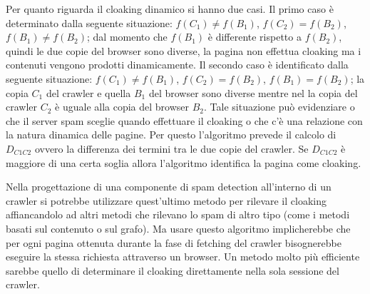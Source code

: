 Per quanto riguarda il cloaking dinamico si hanno due casi. Il primo caso è determinato dalla seguente situazione: \(f(C_1)\not=f(B_1)\), \(f(C_2)=f(B_2)\), \(f(B_1)\not=f(B_2)\); dal momento che \(f(B_1)\) è differente rispetto a \(f(B_2)\), quindi le due copie del browser sono diverse,  la pagina non effettua cloaking ma i contenuti vengono prodotti dinamicamente. Il secondo caso è identificato dalla seguente situazione: \(f(C_1)\not=f(B_1)\), \(f(C_2)=f(B_2)\), \(f(B_1)=f(B_2)\); la copia \(C_1\) del crawler e quella \(B_1\) del browser sono diverse mentre nel  la copia del crawler \(C_2\) è uguale alla copia del browser \(B_2\). Tale situazione può evidenziare o che il server spam sceglie quando effettuare il cloaking o che c'è una relazione con la natura dinamica delle pagine. Per questo l'algoritmo prevede il calcolo di \(D_{C1C2}\) ovvero la differenza dei termini tra le due copie del crawler. Se \(D_{C1C2}\) è maggiore di una certa soglia allora l'algoritmo identifica la pagina come cloaking.

Nella progettazione di una componente di spam detection all'interno di un crawler si potrebbe utilizzare quest'ultimo metodo per rilevare il cloaking affiancandolo ad altri metodi che rilevano lo spam di altro tipo (come i metodi basati sul contenuto o sul grafo). Ma usare questo algoritmo  implicherebbe che per ogni pagina ottenuta durante la fase di fetching del crawler bisognerebbe eseguire la stessa richiesta attraverso un browser. Un metodo molto più efficiente sarebbe quello di determinare il cloaking direttamente nella sola sessione del crawler.

